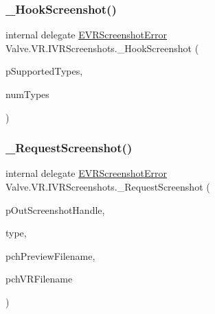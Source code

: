 \mbox{\label{struct_valve_1_1_v_r_1_1_i_v_r_screenshots_ab3be7fe0de54d42becef8b3c699340c3}} 
\subsubsection{\texorpdfstring{\_HookScreenshot()}{\_HookScreenshot()}}
{\footnotesize\ttfamily internal delegate \mbox{\hyperlink{namespace_valve_1_1_v_r_ac73c6dcb1af8fe045a626296a21e226b}{E\+V\+R\+Screenshot\+Error}} Valve.\+V\+R.\+I\+V\+R\+Screenshots.\+\_\+\+Hook\+Screenshot (\begin{DoxyParamCaption}\item[{\mbox{[}\+In, Out\mbox{]} \mbox{\hyperlink{namespace_valve_1_1_v_r_a033ac579445f0992130b11ba62c9b7ae}{E\+V\+R\+Screenshot\+Type}} \mbox{[}$\,$\mbox{]}}]{p\+Supported\+Types,  }\item[{int}]{num\+Types }\end{DoxyParamCaption})}

\mbox{\label{struct_valve_1_1_v_r_1_1_i_v_r_screenshots_af21bcc56545f1819ed8b9e255f184fd4}} 
\subsubsection{\texorpdfstring{\_RequestScreenshot()}{\_RequestScreenshot()}}
{\footnotesize\ttfamily internal delegate \mbox{\hyperlink{namespace_valve_1_1_v_r_ac73c6dcb1af8fe045a626296a21e226b}{E\+V\+R\+Screenshot\+Error}} Valve.\+V\+R.\+I\+V\+R\+Screenshots.\+\_\+\+Request\+Screenshot (\begin{DoxyParamCaption}\item[{ref uint}]{p\+Out\+Screenshot\+Handle,  }\item[{\mbox{\hyperlink{namespace_valve_1_1_v_r_a033ac579445f0992130b11ba62c9b7ae}{E\+V\+R\+Screenshot\+Type}}}]{type,  }\item[{string}]{pch\+Preview\+Filename,  }\item[{string}]{pch\+V\+R\+Filename }\end{DoxyParamCaption})}

